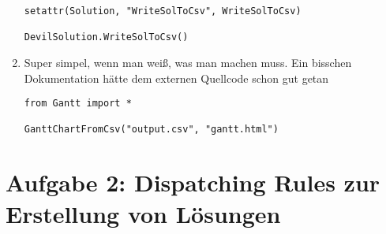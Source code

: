 \documentclass{article}
\begin{document}
\begin{enumerate}[label=(\alph*)]
\begin{lstlisting}
setattr(Solution, "WriteSolToCsv", WriteSolToCsv)

DevilSolution.WriteSolToCsv()
		\end{lstlisting}
		\item Super simpel, wenn man weiß, was man machen muss. Ein bisschen Dokumentation hätte dem externen Quellcode schon gut getan
		\begin{lstlisting}
from Gantt import *

GanttChartFromCsv("output.csv", "gantt.html")
		\end{lstlisting}
	\end{enumerate}

	\section*{Aufgabe 2: Dispatching Rules zur Erstellung von Lösungen}
\end{document}
